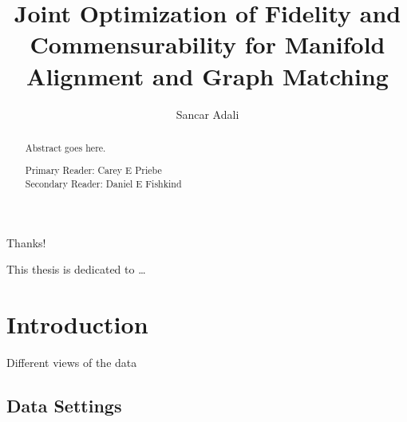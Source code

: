 \documentclass[12pt,oneside,final]{thesis}\usepackage[]{graphicx}\usepackage[]{color}
\begin{document}
\title{Joint Optimization of Fidelity and Commensurability for Manifold Alignment and Graph Matching}
\author{Sancar Adali}
\dissertation
\doctorphilosophy
\copyrightnotice





\begin{frontmatter}

\maketitle

\begin{abstract}

Abstract goes here.

\vspace{1cm}

\noindent Primary Reader: Carey E Priebe\\
Secondary Reader: Daniel E Fishkind

\end{abstract}

\begin{acknowledgment}

Thanks!

\end{acknowledgment}

\begin{dedication}
 
This thesis is dedicated to \ldots

\end{dedication}

\tableofcontents

\listoftables

\listoffigures

\end{frontmatter}




\chapter{Introduction}
\label{sec:intro}


Different views of the data

\section{Data Settings}
\end{document}
